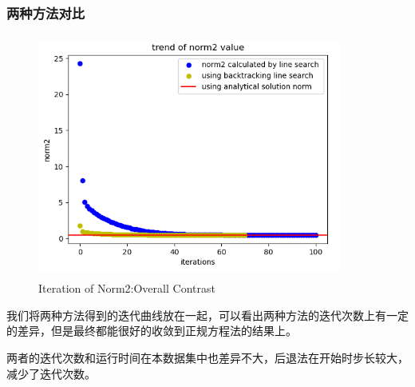 \documentclass[12pt, a4paper, oneside, fontset=windows]{ctexart}
\begin{document}
\subsubsection{两种方法对比}
\begin{figure}[H]
    \centering
    \includegraphics[width=10cm,height=8cm]{Overall Contrast.png}
    \caption{Iteration of Norm2:Overall Contrast}
\end{figure}
我们将两种方法得到的迭代曲线放在一起，可以看出两种方法的迭代次数上有一定的差异，但是最终都能很好的收敛到正规方程法的结果上。

两者的迭代次数和运行时间在本数据集中也差异不大，后退法在开始时步长较大，减少了迭代次数。
\end{document}
